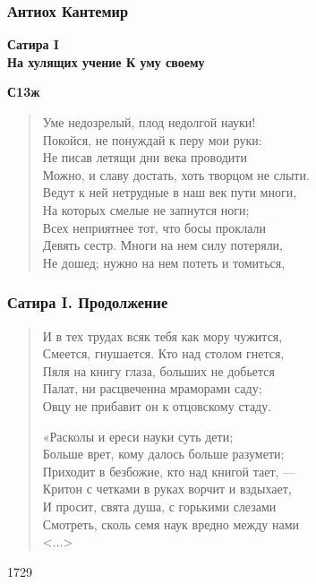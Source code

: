 \documentclass{beamer}
\begin{document}
\begin{frame}
\frametitle{Антиох Кантемир}

\begin{center}
\textbf{Сатира I \\На хулящих учение {\small К уму своему}}
\end{center}

\textbf{С13ж}

\begin{verse}
Уме недозрелый, плод недолгой науки!\\
Покойся, не понуждай к перу мои руки:\\
Не писав летящи дни века проводити\\
Можно, и славу достать, хоть творцом не слыти.\\
Ведут к ней нетрудные в наш век пути многи,\\
На которых смелые не запнутся ноги;\\
Всех неприятнее тот, что босы проклали\\
Девять сестр. Многи на нем силу потеряли,\\
Не дошед; нужно на нем потеть и томиться,\\
\end{verse}

\end{frame}
%
%
\begin{frame}
\frametitle{Сатира I. Продолжение}

\begin{verse}
И в тех трудах всяк тебя как мору чужится,\\
Смеется, гнушается. Кто над столом гнется,\\
Пяля на книгу глаза, больших не добьется\\
Палат, ни расцвеченна мраморами саду;\\
Овцу не прибавит он к отцовскому стаду.

«Расколы и ереси науки суть дети;\\
Больше врет, кому далось больше разумети;\\
Приходит в безбожие, кто над книгой тает, —\\
Критон с четками в руках ворчит и вздыхает,\\
И просит, свята душа, с горькими слезами\\
Смотреть, сколь семя наук вредно между нами\\
<...>
\end{verse}
1729

\end{frame}
\end{document}
